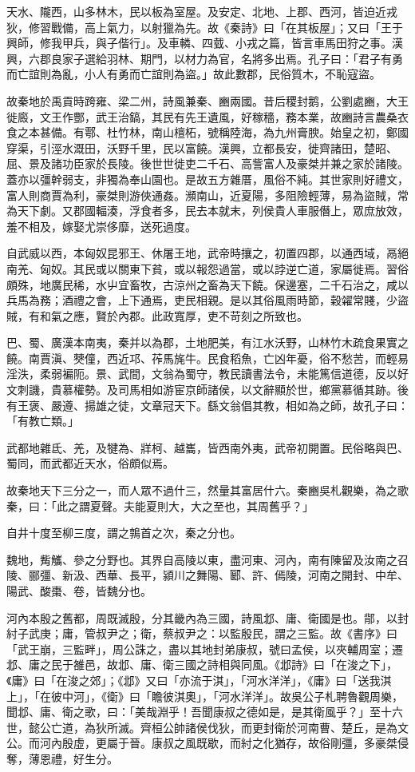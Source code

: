 \begin{pinyinscope}
天水、隴西，山多林木，民以板為室屋。及安定、北地、上郡、西河，皆迫近戎狄，修習戰備，高上氣力，以射獵為先。故《秦詩》曰「在其板屋」；又曰「王于興師，修我甲兵，與子偕行」。及車轔、四臷、小戎之篇，皆言車馬田狩之事。漢興，六郡良家子選給羽林、期門，以材力為官，名將多出焉。孔子曰：「君子有勇而亡誼則為亂，小人有勇而亡誼則為盜。」故此數郡，民俗質木，不恥寇盜。

故秦地於禹貢時跨雍、梁二州，詩風兼秦、豳兩國。昔后稷封鹅，公劉處豳，大王徙廄，文王作酆，武王治鎬，其民有先王遺風，好稼穡，務本業，故豳詩言農桑衣食之本甚備。有鄠、杜竹林，南山檀柘，號稱陸海，為九州膏腴。始皇之初，鄭國穿渠，引涇水溉田，沃野千里，民以富饒。漢興，立都長安，徙齊諸田，楚昭、屈、景及諸功臣家於長陵。後世世徙吏二千石、高訾富人及豪桀并兼之家於諸陵。蓋亦以彊幹弱支，非獨為奉山園也。是故五方雜厝，風俗不純。其世家則好禮文，富人則商賈為利，豪桀則游俠通姦。瀕南山，近夏陽，多阻險輕薄，易為盜賊，常為天下劇。又郡國輻湊，浮食者多，民去本就末，列侯貴人車服僭上，眾庶放效，羞不相及，嫁娶尤崇侈靡，送死過度。

自武威以西，本匈奴昆邪王、休屠王地，武帝時攘之，初置四郡，以通西域，鬲絕南羌、匈奴。其民或以關東下貧，或以報怨過當，或以誖逆亡道，家屬徙焉。習俗頗殊，地廣民稀，水屮宜畜牧，古涼州之畜為天下饒。保邊塞，二千石治之，咸以兵馬為務；酒禮之會，上下通焉，吏民相親。是以其俗風雨時節，穀糴常賤，少盜賊，有和氣之應，賢於內郡。此政寬厚，吏不苛刻之所致也。

巴、蜀、廣漢本南夷，秦并以為郡，土地肥美，有江水沃野，山林竹木疏食果實之饒。南賈滇、僰僮，西近邛、莋馬旄牛。民食稻魚，亡凶年憂，俗不愁苦，而輕易淫泆，柔弱褊阨。景、武間，文翁為蜀守，教民讀書法令，未能篤信道德，反以好文刺譏，貴慕權勢。及司馬相如游宦京師諸侯，以文辭顯於世，鄉黨慕循其跡。後有王褒、嚴遵、揚雄之徒，文章冠天下。繇文翁倡其教，相如為之師，故孔子曰：「有教亡類。」

武都地雜氐、羌，及犍為、牂柯、越巂，皆西南外夷，武帝初開置。民俗略與巴、蜀同，而武都近天水，俗頗似焉。

故秦地天下三分之一，而人眾不過什三，然量其富居什六。秦豳吳札觀樂，為之歌秦，曰：「此之謂夏聲。夫能夏則大，大之至也，其周舊乎？」

自井十度至柳三度，謂之鶉首之次，秦之分也。

魏地，觜觿、參之分野也。其界自高陵以東，盡河東、河內，南有陳留及汝南之召陵、郦彊、新汲、西華、長平，潁川之舞陽、郾、許、傿陵，河南之開封、中牟、陽武、酸棗、卷，皆魏分也。

河內本殷之舊都，周既滅殷，分其畿內為三國，詩風邶、庸、衛國是也。鄁，以封紂子武庚；庸，管叔尹之；衛，蔡叔尹之：以監殷民，謂之三監。故《書序》曰「武王崩，三監畔」，周公誅之，盡以其地封弟康叔，號曰孟侯，以夾輔周室；遷邶、庸之民于雒邑，故邶、庸、衛三國之詩相與同風。《邶詩》曰「在浚之下」，《庸》曰「在浚之郊」；《邶》又曰「亦流于淇」，「河水洋洋」，《庸》曰「送我淇上」，「在彼中河」，《衛》曰「瞻彼淇奧」，「河水洋洋」。故吳公子札聘魯觀周樂，聞邶、庸、衛之歌，曰：「美哉淵乎！吾聞康叔之德如是，是其衛風乎？」至十六世，懿公亡道，為狄所滅。齊桓公帥諸侯伐狄，而更封衛於河南曹、楚丘，是為文公。而河內殷虛，更屬于晉。康叔之風既歇，而紂之化猶存，故俗剛彊，多豪桀侵奪，薄恩禮，好生分。


\end{pinyinscope}
